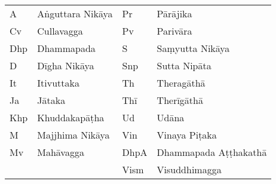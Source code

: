 \clearpage
{}
\bigskip


                 

\bigskip

\begin{tabular}{@{}ll ll@{}}
  A & Aṅguttara Nikāya & Pr & Pārājika\\
  Cv & Cullavagga &       Pv & Parivāra\\
  Dhp & Dhammapada &      S & Saṃyutta Nikāya \\
  D & Dīgha Nikāya  &    Snp & Sutta Nipāta\\
  It & Itivuttaka &       Th & Theragāthā \\
  Ja & Jātaka &           Thī & Therīgāthā\\
  Khp & Khuddakapāṭha &   Ud & Udāna\\
  M & Majjhima Nikāya &  Vin & Vinaya Piṭaka\\
  Mv & Mahāvagga &        DhpA & Dhammapada Aṭṭhakathā\\
  &                    &  Vism & Visuddhimagga\\
\end{tabular}

%
%

